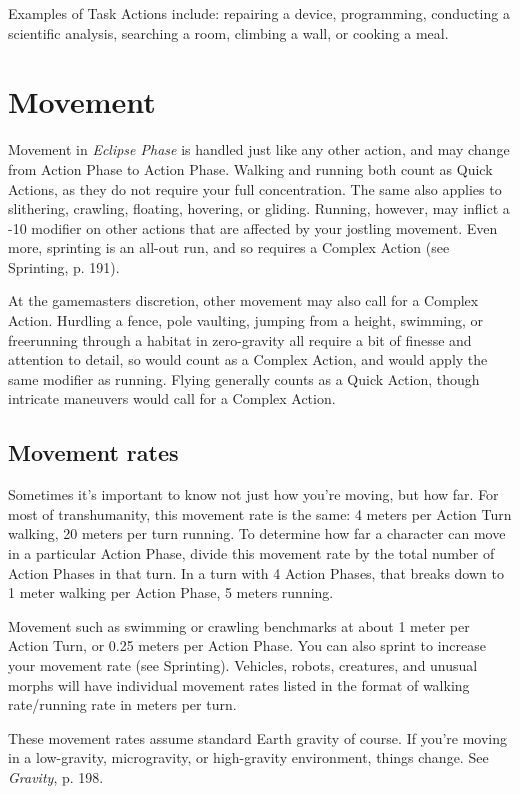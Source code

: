Examples of Task Actions include: repairing a device, programming, conducting a scientific analysis, searching a room, climbing a wall, or cooking a meal.


\section{Movement}
\label{sec:combat-movement}

Movement in \emph{Eclipse Phase} is handled just like any other action, and may change from Action Phase to Action Phase. Walking and running both count as Quick Actions, as they do not require your full concentration. The same also applies to slithering, crawling, floating, hovering, or gliding. Running, however, may inflict a -10 modifier on other actions that are affected by your jostling movement. Even more, sprinting is an all-out run, and so requires a Complex Action (see Sprinting, p. 191).

At the gamemasters discretion, other movement may also call for a Complex Action. Hurdling a fence, pole vaulting, jumping from a height, swimming, or freerunning through a habitat in zero-gravity all require a bit of finesse and attention to detail, so would count as a Complex Action, and would apply the same modifier as running. Flying generally counts as a Quick Action, though intricate maneuvers would call for a Complex Action.


\subsection{Movement rates}
\label{sec:movement-rates}

Sometimes it’s important to know not just how you’re moving, but how far. For most of transhumanity, this movement rate is the same: 4 meters per Action Turn walking, 20 meters per turn running. To determine how far a character can move in a particular Action Phase, divide this movement rate by the total number of Action Phases in that turn. In a turn with 4 Action Phases, that breaks down to 1 meter walking per Action Phase, 5 meters running.

Movement such as swimming or crawling benchmarks at about 1 meter per Action Turn, or 0.25 meters per Action Phase. You can also sprint to increase your movement rate (see Sprinting). Vehicles, robots, creatures, and unusual morphs will have individual movement rates listed in the format of walking rate/running rate in meters per turn.

These movement rates assume standard Earth gravity of course. If you’re moving in a low-gravity, microgravity, or high-gravity environment, things change. See \emph{Gravity}, p. 198.


